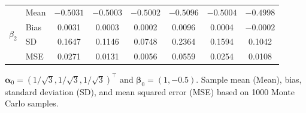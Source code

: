 \begin{table}[ht!]
\begin{threeparttable}
\begin{tabular}{llcccccc}
\multirow{4}{*}{$\beta_{2}$}
& Mean & $-0.5031$ & $-0.5003$ & $-0.5002$ & $-0.5096$ & $-0.5004$ & $-0.4998$ \\
& Bias & 0.0031 & 0.0003 & 0.0002 & 0.0096 & 0.0004 & $-0.0002$ \\
& SD   & 0.1647 & 0.1146 & 0.0748 & 0.2364 & 0.1594 & 0.1042 \\
& MSE  & 0.0271 & 0.0131 & 0.0056 & 0.0559 & 0.0254 & 0.0108 \\

\bottomrule
\end{tabular}
\begin{tablenotes}
\footnotesize
\item $\boldsymbol{\alpha}_0 = (1/\sqrt{3}, 1/\sqrt{3}, 1/\sqrt{3})^\top$ and 
$\boldsymbol{\beta}_0 = (1, -0.5)$. Sample mean (Mean), bias, standard deviation (SD), and mean squared error (MSE) based on 1000 Monte Carlo samples.
\end{tablenotes}
\end{threeparttable}
\end{table}




